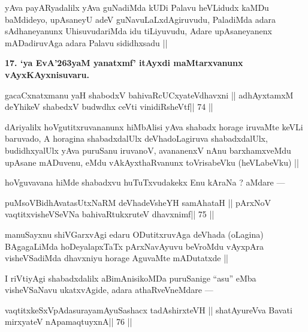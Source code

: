 \begin{artha}
yAva payARyadalilx yAva guNadiMda kUDi Palavu heVLidudx kaMDu baMdideyo, upAsaneyU adeV guNavuLaLxdAgiruvudu, PaladiMda adara sAdhaneyanunx UhisuvudariMda idu tiLiyuvudu, Adare upAsaneyanenx mADadiruvAga adara Palavu sididhxsadu ||
\end{artha}

\begin{artha}
{\bf 17. `ya EvA\char'263yaM yanatxmf' itAyxdi maMtarxvanunx vAyxKAyxnisuvaru.}
\end{artha} 

\begin{shl}
gacaCxnatxmanu yaH shabodxV bahivaRcUCxyateV\s dhavxni ||
adhAyxtamxM deYhikeV shabedxV budwdhx ceVti vinidiRsheVtf\hfill || 74 ||
\end{shl}

\begin{artha}
dAriyalilx hoVgutitxruvananunx hiMbAlisi yAva shabadx horage iruvaMte keVLi baruvado, A horagina shabadxdalUlx deVhadoLagiruva shabadxdalUlx, budidhxyalUlx yAva puruSanu iruvanoV, avananenxV nAnu barxhamxveMdu upAsane mADuvenu, eMdu vAkAyxthaRvanunx toVrisabeVku (heVLabeVku) ||
\end{artha} 
 
\begin{artha}
hoVguvavana hiMde shabadxvu huTuTxvudakekx Enu kAraNa ? aMdare ---
\end{artha} 

\begin{shl}
puMsoV\s BidhAvatasUtxNaRM deVhadeVsheYH samAhataH ||
pArxNoV vaqtitxvisheVSeVNa bahivaRtukxruteV dhavxnimf\hfill || 75 ||
\end{shl}

\begin{artha}
manuSayxnu shiVGarxvAgi edaru ODutitxruvAga deVhada (oLagina) BAgagaLiMda hoDeyalapxTaTx pArxNavAyuvu beVroMdu vAyxpAra visheVSadiMda dhavxniyu horage AguvaMte mADutatxde ||
\end{artha} 
 
\begin{artha}
I riVtiyAgi shabadxdalilx aBimAnisikoMDa puruSanige ``asu'' eMba visheVSaNavu ukatxvAgide, adara athaRveVneMdare --- 
\end{artha} 

\begin{shl}
\footnotemark[9]vaqtitxkeSxVpAdasurayamAyuSashacx tadAshirxteVH ||
shatAyureVva Bavati mirxyateV nApamaqtuyxnA\hfill || 76 ||
\end{shl}

